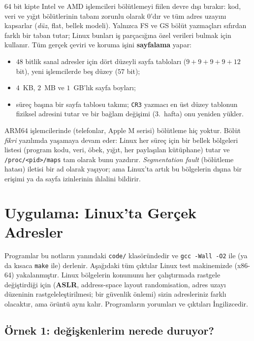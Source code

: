 \documentclass[11pt,a4paper]{article}
\newcommand{\term}[1]{\textbf{\color{mintdeep}#1}}
\newcommand{\cmd}[1]{\texttt{#1}}
\begin{document}
64 bit kipte Intel ve AMD işlemcileri bölütlemeyi fiilen devre dışı bırakır: kod, veri ve yığıt bölütlerinin tabanı zorunlu olarak $0$'dır ve tüm adres uzayını kapsarlar (\emph{düz}, flat, bellek modeli). Yalnızca FS ve GS bölüt yazmaçları sıfırdan farklı bir taban tutar; Linux bunları iş parçacığına özel verileri bulmak için kullanır. Tüm gerçek çeviri ve koruma işini \textbf{sayfalama} yapar:
\begin{itemize}
  \item $48$ bitlik sanal adresler için dört düzeyli sayfa tabloları ($9+9+9+9+12$ bit), yeni işlemcilerde beş düzey ($57$ bit);
  \item $4$~KB, $2$~MB ve $1$~GB'lık sayfa boyları;
  \item süreç başına bir sayfa tablosu takımı; \texttt{CR3} yazmacı en üst düzey tablonun fiziksel adresini tutar ve bir bağlam değişimi (3.~hafta) onu yeniden yükler.
\end{itemize}
ARM64 işlemcilerinde (telefonlar, Apple M serisi) bölütleme hiç yoktur. Bölüt \emph{fikri} yazılımda yaşamaya devam eder: Linux her süreç için bir bellek bölgeleri listesi (program kodu, veri, öbek, yığıt, her paylaşılan kütüphane) tutar ve \texttt{/proc/<pid>/maps} tam olarak bunu yazdırır. \emph{Segmentation fault} (bölütleme hatası) iletisi bir ad olarak yaşıyor; ama Linux'ta artık bu bölgelerin dışına bir erişimi ya da sayfa izinlerinin ihlalini bildirir.

\section{Uygulama: Linux'ta Gerçek Adresler}
\label{sec:handson}

Programlar bu notların yanındaki \texttt{code/} klasöründedir ve \cmd{gcc -Wall -O2} ile (ya da kısaca \cmd{make} ile) derlenir. Aşağıdaki tüm çıktılar Linux test makinemizde (x86-64) yakalanmıştır. Linux bölgelerin konumunu her çalıştırmada rastgele değiştirdiği için (\term{ASLR}, address-space layout randomisation, adres uzayı düzeninin rastgeleleştirilmesi; bir güvenlik önlemi) sizin adresleriniz farklı olacaktır, ama örüntü aynı kalır. Programların yorumları ve çıktıları İngilizcedir.

\subsection{Örnek 1: değişkenlerim nerede duruyor?}
\end{document}
